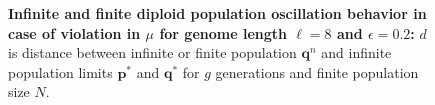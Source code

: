 \begin{figure}[H]
\begin{center}
\hspace{5pt}
\hspace{5pt}


\caption{\textbf{Infinite and finite diploid population oscillation behavior in case of violation in $\mu$ for genome length $\ell = 8$ and $\epsilon = 0.2$:} $d$ is
  distance between infinite or finite population ${\bm q}^n$ and infinite
  population limits ${{\bm p}^\ast}$ and ${{\bm q}^{\ast}}$ for $g$ generations and finite population size $N$.}
\label{oscillation_8d_vio_mu_0.2}
\end{center}
\end{figure}

